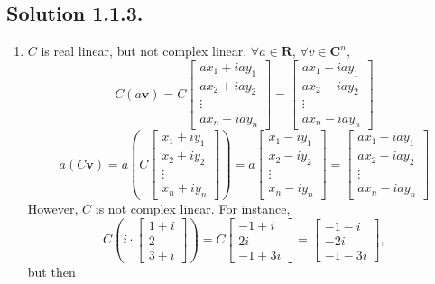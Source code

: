 \documentclass{article}
\begin{document}
\subsection*{Solution 1.1.3.}
\begin{enumerate}
    \item $C$ is real linear, but not complex linear. $\forall a\in \mathbf{R}$, $\forall v\in \mathbf{C}^n$, 
    \[C(a\mathbf{v})=C\left[\begin{array}{c}ax_1+iay_1\\ax_2+iay_2\\\vdots\\ax_n+iay_n\end{array}\right]=\left[\begin{array}{c}ax_1-iay_1\\ax_2-iay_2\\\vdots\\ax_n-iay_n\end{array}\right]\]
    \[a(C\mathbf{v})=a\left(C\left[\begin{array}{c}x_1+iy_1\\x_2+iy_2\\\vdots\\x_n+iy_n\end{array}\right]\right)=a\left[\begin{array}{c}x_1-iy_1\\x_2-iy_2\\\vdots\\x_n-iy_n\end{array}\right]=\left[\begin{array}{c}ax_1-iay_1\\ax_2-iay_2\\\vdots\\ax_n-iay_n\end{array}\right]\]
    However, $C$ is not complex linear. For instance, 
    \[C\left(i\cdot\left[\begin{array}{c}1+i\\2\\3+i\end{array}\right]\right)=C\left[\begin{array}{c}-1+i\\2i\\-1+3i\end{array}\right]=\left[\begin{array}{c}-1-i\\-2i\\-1-3i\end{array}\right],\]
    but then

\end{enumerate}
\end{document}
